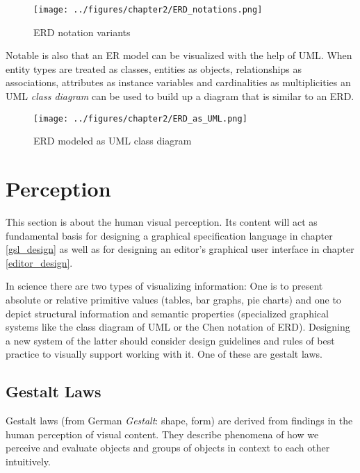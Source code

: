 \documentclass[twoside, openright, 12pt]{book}
\begin{document}
\begin{figure}[htb]
	\centering
	\texttt{[image: ../figures/chapter2/ERD\_notations.png]}
	\caption{ERD notation variants}
	\label{fig:ERD_notations}
\end{figure}

\noindent
Notable is also that an ER model can be visualized with the help of UML.
When entity types are treated as classes, entities as objects, relationships as associations, attributes as instance variables and cardinalities as multiplicities an UML \textit{class diagram} can be used to build up a diagram that is similar to an ERD.

\begin{figure}[htb]
	\centering
	\texttt{[image: ../figures/chapter2/ERD\_as\_UML.png]}
	\caption{ERD modeled as UML class diagram}
	\label{fig:ERD_as_UML}
\end{figure}




\section{Perception}
\label{perception}
This section is about the human visual perception.
Its content will act as fundamental basis for designing a graphical specification language in chapter \ref{gsl_design} as well as for designing an editor's graphical user interface in chapter \ref{editor_design}.

In science there are two types of visualizing information:
One is to present absolute or relative primitive values (tables, bar graphs, pie charts) and one to depict structural information and semantic properties (specialized graphical systems like the class diagram of UML or the Chen notation of ERD).
Designing a new system of the latter should consider design guidelines and rules of best practice to visually support working with it.
One of these are gestalt laws.

\subsection{Gestalt Laws}
\label{gestalt_laws}
Gestalt laws (from German \textit{Gestalt}: shape, form) are derived from findings in the human perception of visual content.
They describe phenomena of how we perceive and evaluate objects and groups of objects in context to each other intuitively.
\end{document}
